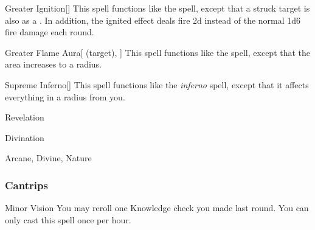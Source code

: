 \lowercase{\hypertarget{spell:Greater Ignition}{}}\label{spell:Greater Ignition}
\begin{freeability}[\nth{5}]{\hypertarget{spell:Greater Ignition}{Greater Ignition}}[]
This spell functions like the  spell, except that a struck target is also  as a .
In addition, the ignited effect deals fire  \minus2d instead of the normal 1d6 fire damage each round.
\end{freeability}
\vspace{0.25em}



\lowercase{\hypertarget{spell:Greater Flame Aura}{}}\label{spell:Greater Flame Aura}
\begin{attuneability}[\nth{6}]{\hypertarget{spell:Greater Flame Aura}{Greater Flame Aura}}[ (target), ]
This spell functions like the  spell, except that the area increases to a \areamed radius.
\end{attuneability}
\vspace{0.25em}



\lowercase{\hypertarget{spell:Supreme Inferno}{}}\label{spell:Supreme Inferno}
\begin{freeability}[\nth{6}]{\hypertarget{spell:Supreme Inferno}{Supreme Inferno}}[]
This spell functions like the \textit{inferno} spell, except that it affects everything in a \areahuge radius from you.
\end{freeability}
\vspace{0.25em}


\newpage
\begin{spellsection}{Revelation}

\begin{spellheader}
\end{spellheader}


 Divination

 Arcane, Divine, Nature

\subsubsection{Cantrips}


\begin{apability}{Minor Vision}
You may reroll one Knowledge check you made last round.
You can only cast this spell once per hour.
\end{apability}

\end{spellsection}



